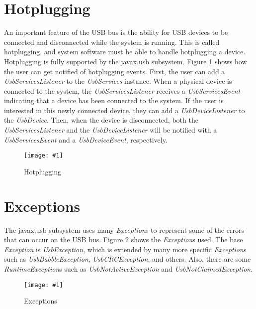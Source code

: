\documentclass{article}
\newcommand{\myclass}[1]{\emph{#1}}
\newcommand{\myinterface}[1]{\emph{#1}}
\newcommand{\mysectionend}[0]{\vfill\pagebreak[1]}
\newcommand{\myfigure}[3]{\begin{figure}[htbp]\centering\texttt{[image: \#1]}\caption{#2}\label{#3}\end{figure}}
\begin{document}
%

\section{Hotplugging}

An important feature of the USB bus is the ability for USB devices to
be connected and disconnected while the system is running.  This is called
hotplugging, and system software must be able to handle hotplugging a device.
Hotplugging is fully supported by the javax.usb subsystem.  Figure
\ref{Hotplugging} shows how the user can get notified of hotplugging events.
First, the user can add a \myinterface{UsbServicesListener} to the \myinterface{UsbServices} instance.
When a physical device is connected to the system, the \myinterface{UsbServicesListener}
receives a \myclass{UsbServicesEvent} indicating that a device has been connected to the
system.  If the user is interested in this newly connected device, they can
add a \myinterface{UsbDeviceListener} to the \myinterface{UsbDevice}.  Then, when the device is
disconnected, both the \myinterface{UsbServicesListener} and the \myinterface{UsbDeviceListener} will be
notified with a \myclass{UsbServicesEvent} and a \myclass{UsbDeviceEvent}, respectively.

\myfigure{figs/Hotplugging}{Hotplugging}{Hotplugging}

\mysectionend

\pagebreak

%

\section{Exceptions}

The javax.usb subsystem uses many \myclass{Exception}s to represent some of the
errors that can occur on the USB bus.  Figure \ref{Exceptions} shows the
\myclass{Exception}s used.  The base \myclass{Exception} is \myclass{UsbException}, which is extended by
many more specific \myclass{Exception}s such as \myclass{UsbBabbleException}, \myclass{UsbCRCException},
and others.  Also, there are some \myclass{RuntimeException}s such as \myclass{UsbNotActiveException}
and \myclass{UsbNotClaimedException}.

\myfigure{figs/Exceptions}{Exceptions}{Exceptions}

\mysectionend
\end{document}
